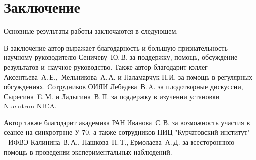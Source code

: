 \chapter*{Заключение}                       %


Основные результаты работы заключаются в следующем.


В заключение автор
выражает благодарность и большую признательность научному руководителю
Сеничеву~Ю.\,В. за поддержку, помощь, обсуждение результатов и~научное
руководство. 
Также автор благодарит коллег Аксентьева~А.\,Е.,~Мельникова~А.\,А. и Паламарчук П.И. за помощь в регулярных обсуждениях. Cотрудников ОИЯИ Лебедева~В.\,A. за плодотворные дискуссии, Сыресина~E.\,М. и Ладыгина~В.\,П. за поддержку в изучении установки Nuclotron-NICA.

Автор также благодарит академика РАН Иванова~С.\,В. за возможность участия в сеансе на синхротроне У-70, а также сотрудников НИЦ "Курчатовский институт" - ИФВЭ Калинина~В.\,А., Пашкова~П.\,Т., Ермолаева~А.\,Д. за всестороннюю помощь в проведении экспериментальных наблюдений.
